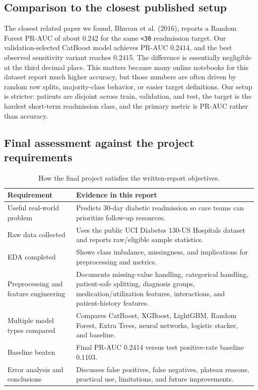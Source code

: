 \documentclass[10pt]{article}
\newcommand{\tightsubsection}[1]{\vspace{2pt}\subsection{#1}\vspace{-3pt}}
\begin{document}
\tightsubsection{Comparison to the closest published setup}

The closest related paper we found, Bhuvan et al. (2016), reports a Random Forest PR-AUC of about 0.242 for the same \texttt{<30} readmission target. Our validation-selected CatBoost model achieves PR-AUC 0.2414, and the best observed sensitivity variant reaches 0.2415. The difference is essentially negligible at the third decimal place. This matters because many online notebooks for this dataset report much higher accuracy, but those numbers are often driven by random row splits, majority-class behavior, or easier target definitions. Our setup is stricter: patients are disjoint across train, validation, and test, the target is the hardest short-term readmission class, and the primary metric is PR-AUC rather than accuracy.

\tightsubsection{Final assessment against the project requirements}

\begin{table}[H]
\centering
\caption{How the final project satisfies the written-report objectives.}
\small
\begin{tabularx}{0.98\textwidth}{p{1.9in}Y}
\toprule
Requirement & Evidence in this report \\
\midrule
Useful real-world problem & Predicts 30-day diabetic readmission so care teams can prioritize follow-up resources. \\
Raw data collected & Uses the public UCI Diabetes 130-US Hospitals dataset and reports raw/eligible sample statistics. \\
EDA completed & Shows class imbalance, missingness, and implications for preprocessing and metrics. \\
Preprocessing and feature engineering & Documents missing-value handling, categorical handling, patient-safe splitting, diagnosis groups, medication/utilization features, interactions, and patient-history features. \\
Multiple model types compared & Compares CatBoost, XGBoost, LightGBM, Random Forest, Extra Trees, neural networks, logistic stacker, and baseline. \\
Baseline beaten & Final PR-AUC 0.2414 versus test positive-rate baseline 0.1103. \\
Error analysis and conclusions & Discusses false positives, false negatives, plateau reasons, practical use, limitations, and future improvements. \\
\bottomrule
\end{tabularx}
\end{table}
\end{document}
